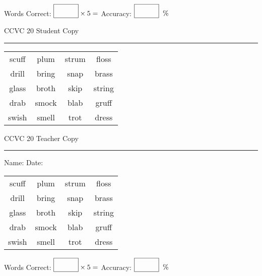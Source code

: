 \documentclass{memoir}
\begin{document}
\normalsize

Words Correct: $\fbox{\phantom{\huge 100}} \times 5 = $ Accuracy: $\fbox{\phantom{\huge 100}}\;\; \%$ 

\vfill

\newpage



\footnotesize \noindent
CCVC 20 \hfill Student Copy
\smallskip
\hrule

\Large

\setlength{\tabcolsep}{14pt}
\def\arraystretch{3}

{\selectfont


\begin{vplace}[0.5]
\begin{center}
\begin{tabular}{cccc}
scuff & plum & strum & floss \\
drill & bring      & snap & brass       \\
glass & broth    & skip & string \\
drab             & smock & blab             & gruff \\
swish & smell & trot & dress \\
\end{tabular}
\end{center}
\end{vplace}

}

\newpage

\footnotesize \noindent
CCVC 20 \hfill Teacher Copy
\smallskip
\hrule

\normalsize

\vfill

\noindent
Name: \underline{\hspace{1.75in}} \hfill Date: \underline{\hspace{1in}}

\Large

{\selectfont


\begin{vplace}[0.5]
\begin{center}
\begin{tabular}{cccc}
scuff & plum & strum & floss \\
drill & bring      & snap & brass       \\
glass & broth    & skip & string \\
drab             & smock & blab             & gruff \\
swish & smell & trot & dress \\
\end{tabular}
\end{center}
\end{vplace}



}

\normalsize

Words Correct: $\fbox{\phantom{\huge 100}} \times 5 = $ Accuracy: $\fbox{\phantom{\huge 100}}\;\; \%$ 

\vfill

\end{document}
